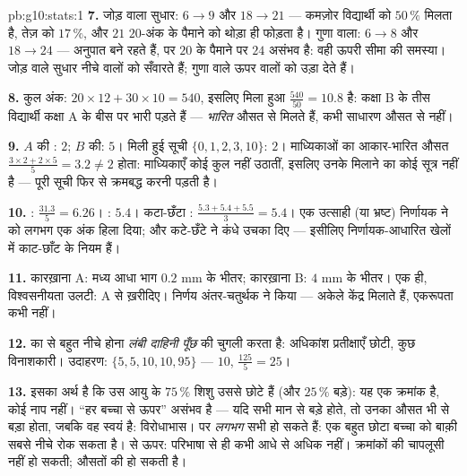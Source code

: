 \begin{solution}{pb:g10:stats:1}
\textbf{7.} जोड़ वाला सुधार: $6 \to 9$ और $18 \to 21$ --- कमज़ोर विद्यार्थी को $50\,\%$
मिलता है, तेज़ को $17\,\%$, और $21$ $20$-अंक के पैमाने को थोड़ा ही फोड़ता
है। गुणा वाला: $6 \to 8$ और $18 \to 24$ --- अनुपात बने रहते हैं, पर $20$ के पैमाने
पर $24$ असंभव है: वही ऊपरी सीमा की समस्या। जोड़ वाले सुधार नीचे वालों को
सँवारते हैं; गुणा वाले ऊपर वालों को उड़ा देते हैं।

\textbf{8.} कुल अंक: $20 \times 12 + 30 \times 10 = 540$, इसलिए मिला हुआ  $\frac{540}{50} = 10.8$ है: कक्षा B के तीस
विद्यार्थी कक्षा A के बीस पर भारी पड़ते हैं ---  \emph{भारित} औसत से
मिलते हैं, कभी साधारण औसत से नहीं।

\textbf{9.} $A$ की : $2$; $B$ की: $5$। मिली हुई सूची $\{0, 1, 2, 3, 10\}$:
 $2$। माध्यिकाओं का आकार-भारित औसत $\frac{3 \times 2 + 2 \times 5}{5} = 3.2
\neq 2$ होता: माध्यिकाएँ कोई कुल
नहीं उठातीं, इसलिए उनके मिलाने का कोई सूत्र नहीं है --- पूरी सूची फिर से
क्रमबद्ध करनी पड़ती है।

\textbf{10.} : $\frac{31.3}{5} = 6.26$। : $5.4$। कटा-छँटा : $\frac{5.3 + 5.4 + 5.5}{3} = 5.4$। एक
उत्साही (या भ्रष्ट) निर्णायक ने  को लगभग एक अंक हिला दिया;  और
कटे-छँटे  ने कंधे उचका दिए --- इसीलिए निर्णायक-आधारित खेलों में
काट-छाँट के नियम हैं।

\textbf{11.} कारख़ाना A: मध्य आधा भाग $0.2$ mm के भीतर; कारख़ाना B: $4$
mm के भीतर।  एक ही, विश्वसनीयता उलटी: A से ख़रीदिए। निर्णय
अंतर-चतुर्थक  ने किया --- अकेले  केंद्र मिलाते हैं, एकरूपता कभी
नहीं।

\textbf{12.}  का  से बहुत नीचे होना \emph{लंबी दाहिनी पूँछ}
की चुगली करता है: अधिकांश प्रतीक्षाएँ छोटी, कुछ विनाशकारी। उदाहरण: $\{5, 5, 10, 10, 95\}$
---  $10$,  $\frac{125}{5} = 25$।

\textbf{13.} इसका अर्थ है कि उस आयु के $75\,\%$ शिशु उससे छोटे हैं (और $25\,\%$
बड़े): यह एक क्रमांक है, कोई नाप नहीं। ``हर बच्चा  से ऊपर'' असंभव है
--- यदि सभी मान  से बड़े होते, तो उनका औसत भी  से बड़ा होता, जबकि
वह स्वयं  है: विरोधाभास। पर \emph{लगभग} सभी हो सकते हैं: एक बहुत छोटा
बच्चा  को बाक़ी सबसे नीचे रोक सकता है। \emph{} से ऊपर:
परिभाषा से ही कभी आधे से अधिक नहीं। क्रमांकों की चापलूसी नहीं हो सकती;
औसतों की हो सकती है।


\end{solution}
